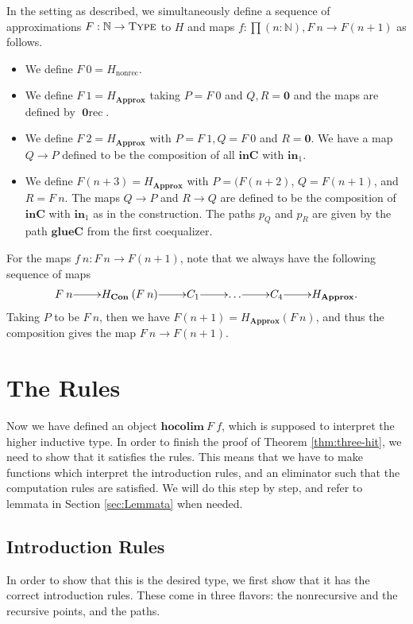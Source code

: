 \documentclass[a4paper,UKenglish]{lipics-v2016}
\newcommand{\Boperator}[1]{\mathrm{\mathbf{#1}}}
\newcommand{\inn}{\Boperator{in}}
\newcommand{\zero}[0]{\textbf{0}}
\newcommand{\frec}[0]{\!\operatorname{rec}}
\newcommand{\nonrec}[0]{\operatorname{nonrec}}
\newcommand{\Con}[0]{\textbf{Con}}
\newcommand{\Approx}[0]{\textbf{Approx}}
\newcommand{\inC}[0]{\Boperator{inC}}
\newcommand{\glueC}[0]{\Boperator{glueC}}
\newcommand{\hocolim}[0]{\Boperator{hocolim}}
\newcommand{\Type}[0]{\operatorname{\textsc{Type}}}
\begin{document}
\begin{definition}
In the setting as described, we simultaneously define a sequence of approximations $F : \mathbb{N} \rightarrow \Type$ to $H$ and maps $f : \prod(n : \mathbb{N}), F \> n \rightarrow F(n+1)$ as follows.
\begin{itemize}
        \item We define $F \> 0 = H_{\nonrec}$.
        \item We define $F \> 1 = H_{\Approx}$ taking $P = F \> 0$ and $Q, R = \zero$ and the maps are defined by $\zero\frec$.
        \item We define $F \> 2 = H_{\Approx}$ with $P= F \> 1, Q = F \> 0$ and $R =\zero$. We have a map $Q \rightarrow P$ defined to be the composition of all $\inC$ with $\inn_1$.
        \item We define $F(n+3) = H_{\Approx}$ with $P = (F(n+2)$, $Q = F(n+1)$, and $R = F \> n$. The maps $Q \rightarrow P$ and $R \rightarrow Q$ are defined to be the composition of $\inC$ with $\inn_1$ as in the construction. The paths $p_Q$ and $p_R$ are given by the path $\glueC$ from the first coequalizer.
\end{itemize}
For the maps $f \> n : F \> n \rightarrow F(n + 1)$, note that we always have the following sequence of maps
\[
\xymatrix@1
{
        F \> n \ar[r] & H_{\Con} \> (F \> n) \ar[r] & C_1 \ar[r] & \ldots \ar[r] & C_4 \ar[r] & H_{\Approx}.
}
\]
Taking $P$ to be $F \> n$, then we have $F (n+1) = H_{\Approx} (F \> n)$, and thus the composition gives the map $F \> n \rightarrow F(n + 1)$.
\end{definition}

\section{The Rules}
\label{sec:rules}
Now we have defined an object $\hocolim \> F \> f$, which is supposed to interpret the higher inductive type.
In order to finish the proof of Theorem \ref{thm:three-hit}, we need to show that it satisfies the rules.
This means that we have to make functions which interpret the introduction rules, and an eliminator such that the computation rules are satisfied.
We will do this step by step, and refer to lemmata in Section \ref{sec:Lemmata} when needed.

\subsection{Introduction Rules}
In order to show that this is the desired type, we first show that it has the correct introduction rules.
These come in three flavors: the nonrecursive and the recursive points, and the paths.
\end{document}
